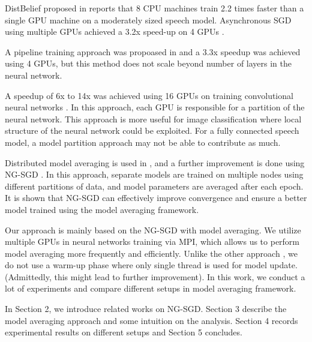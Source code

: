 \documentclass{article}
\begin{document}
DistBelief proposed in \cite{dean2012large} reports that 8 CPU machines train 2.2 times faster than a single GPU machine on a
moderately sized speech model. Asynchronous SGD using multiple GPUs achieved a 3.2x speed-up on 4 GPUs \cite{zhang2013asynchronous}.

A pipeline training approach was propoased in \cite{chen2012pipelined} and a 3.3x speedup was achieved using 4 GPUs, but this
method does not scale beyond number of layers in the neural network.

A speedup of 6x to 14x was achieved using 16 GPUs on training convolutional neural networks \cite{coates2013deep}. In this approach,
each GPU is responsible for a partition of the neural network. This approach is more useful for image classification where 
local structure of the neural network could be exploited. For a fully connected speech model, a model partition approach 
may not be able to contribute as much.

Distributed model averaging is used in \cite{zhang2014improving,miao2014distributed}, and a further improvement 
is done using NG-SGD \cite{povey2014parallel}. In this approach, separate models are trained on multiple nodes using 
different partitions of data, and model parameters are averaged after each epoch. It is shown that NG-SGD can effectively improve
convergence and ensure a better model trained using the model averaging framework.

Our approach is mainly based on the NG-SGD with model averaging. We utilize multiple GPUs in neural networks training via 
MPI, which allows us to perform model averaging more frequently and efficiently. Unlike the other approach \cite{seide20141},
we do not use a warm-up phase where only single thread is used for model update. (Admittedly, this might lead to further improvement). 
In this work, we conduct a lot of experiments and compare different setups in model averaging framework.

In Section 2, we introduce related works on NG-SGD. Section 3 describe the model averaging approach and some 
intuition on the analysis. Section 4 records experimental results on different setups and Section 5 concludes.
\end{document}
